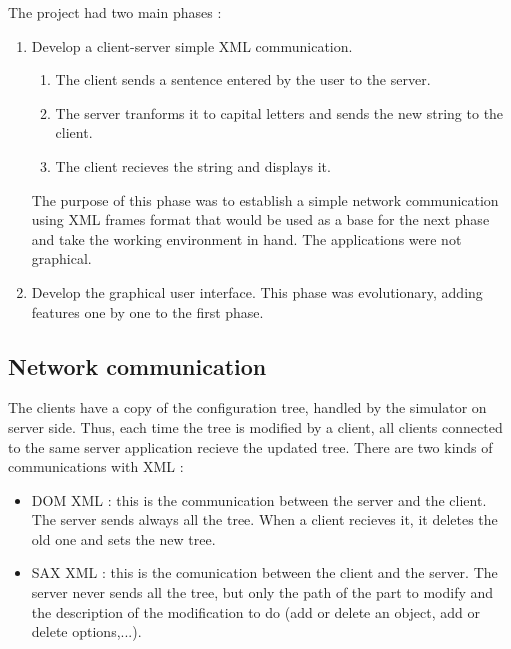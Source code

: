 The project had two main phases :
\begin{enumerate}
 \item Develop a client-server simple XML communication.
 \begin{enumerate}
 \item The client sends a sentence entered by the user to the server.
 \item The server tranforms it to capital letters and sends the new string to
the client.
 \item The client recieves the string and displays it.
 \end{enumerate}
 The purpose of this phase was to establish a simple network communication using
XML frames format that would be used as a base for the next phase and take the
working environment in hand. The applications were not graphical.

 \item Develop the graphical user interface. This phase was evolutionary, adding
features one by one to the first phase. 
\end{enumerate}


\subsection{Network communication}

The clients have a copy of the configuration tree, handled by the simulator on
server side. Thus, each time the tree is modified by a client, all clients
connected to the same server application recieve the updated tree. There are
two kinds of communications with XML :
\begin{itemize}
 \item DOM XML : this is the communication between the server and the client.
The server sends always all the tree. When a client recieves it, it deletes the
old one and sets the new tree.
 \item SAX XML : this is the comunication between the client and the server.
The server never sends all the tree, but only the path of the part to modify
and the description of the modification to do (add or delete an object, add or
delete options,...).
\end{itemize}


